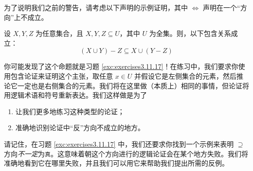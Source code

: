 为了说明我们之前的警告，请考虑以下声明的示例证明，其中 $\iff$ 声明在一个``方向''上不成立。

\begin{proposition}\label{prop:proposition4.6.11}
    设 $X, Y, Z$ 为任意集合，且 $X, Y, Z \subseteq U$，其中 $U$ 为全集。则，以下包含关系成立：
    \[(X \cup Y ) - Z \subseteq X \cup (Y - Z)\]
\end{proposition}

你可能发现了这个命题就是习题 \ref{exc:exercises3.11.17}！在练习中，我们要求你使用包含论证来证明这个主张，取任意 $x \in U$ 并假设它是左侧集合的元素，然后推论它一定也是右侧集合的元素。我们将在这里做（本质上）相同的事情，但论证将用逻辑术语和符号重新表达。我们这样做是为了
\begin{enumerate}
    \item 让我们更多地练习这种类型的论证；
    \item 准确地识别论证中``反''方向不成立的地方。 
\end{enumerate}
请记住，在习题 \ref{exc:exercises3.11.17} 中，我们还要求你找到一个示例来表明 $\supseteq$ 方向\emph{不一定}为\verb|真|。这意味着朝这个方向进行的逻辑论证会在某个地方失败。我们将准确地看到它在哪里失败，并且我们可以用它来帮助我们提出所需的反例。

